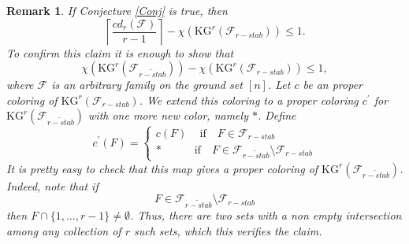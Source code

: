 \documentclass[preprint,12pt,3p]{elsarticle}
\newtheorem{remark}[theorem]{Remark}
\begin{document}
\begin{remark}
\normalfont
If Conjecture \ref{Conj} is true, then 
$$\left\lceil\frac{cd_r\left(\mathcal{F}\right)}{r-1}\right\rceil-\chi\left(\textrm{KG}^r\left(\mathcal{F}_{r-stab}\right)\right)\leq 1.$$
To confirm this claim it is enough to show that
$$\chi\left(\textrm{KG}^r\left(\mathcal{F}_{\widetilde{r-stab}}\right)\right)-\chi\left(\textrm{KG}^r\left(\mathcal{F}_{{r-stab}}\right)\right)\leq 1,$$
where $\mathcal{F}$ is an arbitrary family on the ground set $[n]$.
Let $c$ be an proper coloring of $\textrm{KG}^r\left(\mathcal{F}_{{r-stab}}\right)$. We extend this coloring to a proper coloring $c^{\prime}$ for $\textrm{KG}^r\left(\mathcal{F}_{\widetilde{r-stab}}\right)$ with one more new color, namely $\ast$. Define
\[ c^{\prime}\left(F\right)=\begin{cases} 
      c\left(F\right)\quad\, \text{if}\quad F\in \mathcal{F}_{{r-stab}}\\
      \ast\quad\quad\quad \text{if}\quad F\in \mathcal{F}_{\widetilde{r-stab}}\setminus \mathcal{F}_{{r-stab}}
   \end{cases}
\]
It is pretty easy to check that this map gives a proper coloring of $\textrm{KG}^r\left(\mathcal{F}_{\widetilde{r-stab}}\right)$. Indeed, note that if $$F\in \mathcal{F}_{\widetilde{r-stab}}\setminus \mathcal{F}_{{r-stab}}$$
then $F\cap\{1, \ldots, r-1\}\neq\emptyset$. Thus, there are two sets with a non empty intersection among any collection of $r$ such sets, which this verifies the claim.
\end{remark}












\medskip
 


\end{document}
